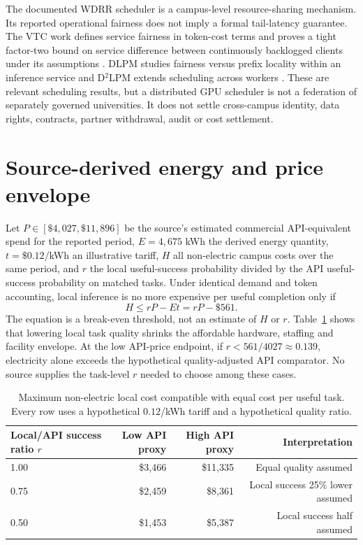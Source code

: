 The documented WDRR scheduler is a campus-level resource-sharing mechanism. Its reported operational fairness does not imply a formal tail-latency guarantee. The VTC work defines service fairness in token-cost terms and proves a tight factor-two bound on service difference between continuously backlogged clients under its assumptions \cite{sheng2024}. DLPM studies fairness versus prefix locality within an inference service and D$^2$LPM extends scheduling across workers \cite{cao2025}. These are relevant scheduling results, but a distributed GPU scheduler is not a federation of separately governed universities. It does not settle cross-campus identity, data rights, contracts, partner withdrawal, audit or cost settlement.

\section{Source-derived energy and price envelope}
Let $P\in[\$4{,}027,\$11{,}896]$ be the source's estimated commercial API-equivalent spend for the reported period, $E=4{,}675$ kWh the derived energy quantity, $t=\$0.12$/kWh an illustrative tariff, $H$ all non-electric campus costs over the same period, and $r$ the local useful-success probability divided by the API useful-success probability on matched tasks. Under identical demand and token accounting, local inference is no more expensive per useful completion only if
\[
H \leq rP - Et = rP - \$561.
\]
The equation is a break-even threshold, not an estimate of $H$ or $r$. Table~\ref{tab:break-even} shows that lowering local task quality shrinks the affordable hardware, staffing and facility envelope. At the low API-price endpoint, if $r<561/4027\approx0.139$, electricity alone exceeds the hypothetical quality-adjusted API comparator. No source supplies the task-level $r$ needed to choose among these cases.

\begin{table}[ht]
\centering\small
\caption{Maximum non-electric local cost compatible with equal cost per useful task. Every row uses a hypothetical $0.12$/kWh tariff and a hypothetical quality ratio.}
\label{tab:break-even}
\begin{tabular}{lrrr}
\toprule
Local/API success ratio $r$ & Low API proxy & High API proxy & Interpretation \\
\midrule
1.00 & \$3,466 & \$11,335 & Equal quality assumed \\
0.75 & \$2,459 & \$8,361 & Local success 25\% lower assumed \\
0.50 & \$1,453 & \$5,387 & Local success half assumed \\
\bottomrule
\end{tabular}
\end{table}

